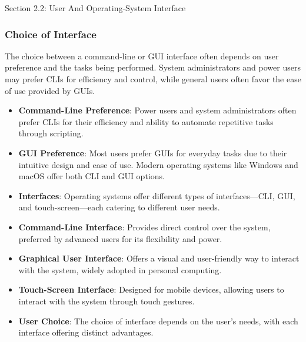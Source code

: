 \begin{notes}{Section 2.2: User And Operating-System Interface}
\begin{highlight}
    \end{highlight}
    
    \subsubsection*{Choice of Interface}
    
    The choice between a command-line or GUI interface often depends on user preference and the tasks being performed. System administrators and power users may prefer CLIs for efficiency and control, 
    while general users often favor the ease of use provided by GUIs.
    
    \begin{highlight}
    
    \begin{itemize}
        \item \textbf{Command-Line Preference}: Power users and system administrators often prefer CLIs for their efficiency and ability to automate repetitive tasks through scripting.
        \item \textbf{GUI Preference}: Most users prefer GUIs for everyday tasks due to their intuitive design and ease of use. Modern operating systems like Windows and macOS offer both CLI and GUI options.
    \end{itemize}
    
    \end{highlight}
    
    \begin{highlight}
    
    \begin{itemize}
        \item \textbf{Interfaces}: Operating systems offer different types of interfaces—CLI, GUI, and touch-screen—each catering to different user needs.
        \item \textbf{Command-Line Interface}: Provides direct control over the system, preferred by advanced users for its flexibility and power.
        \item \textbf{Graphical User Interface}: Offers a visual and user-friendly way to interact with the system, widely adopted in personal computing.
        \item \textbf{Touch-Screen Interface}: Designed for mobile devices, allowing users to interact with the system through touch gestures.
        \item \textbf{User Choice}: The choice of interface depends on the user's needs, with each interface offering distinct advantages.
    \end{itemize}
    
    \end{highlight}
\end{notes}

